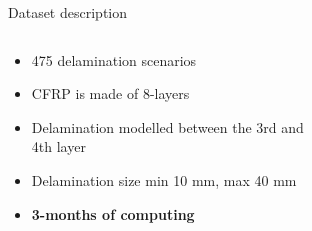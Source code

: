 \documentclass[10pt,aspectratio=169,dvipsnames]{beamer} %
\begin{document}
	\setcounter{subfigure}{0}
	\begin{frame}{Dataset description}
		\begin{columns}[T]
			\begin{column}[t]{0.35\textwidth}
					\begin{itemize}
						\item 475 delamination scenarios
						\item CFRP is made of 8-layers
						\item Delamination modelled between the 3rd and 4th layer
						\item Delamination size min 10 mm, max  40 mm
						\item \textbf{3-months of computing}
					\end{itemize}
			\end{column}
			\begin{column}[t]{0.2\textwidth}
				\begin{figure}[t]
					\centering
				\end{figure}
			\end{column}
			\begin{column}[t]{0.45\textwidth}
					\begin{figure}[t]					
						\centering						

\end{figure}
\end{column}
\end{columns}
\end{frame}
\end{document}
